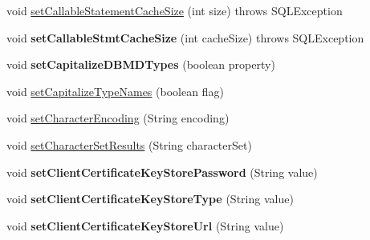 \begin{DoxyCompactItemize}
\item 
void \mbox{\hyperlink{classcom_1_1mysql_1_1jdbc_1_1_multi_host_my_s_q_l_connection_a738d6bb9fa72c912b24fa0fb9d978af9}{set\+Callable\+Statement\+Cache\+Size}} (int size)  throws S\+Q\+L\+Exception 
\item 
\mbox{\label{classcom_1_1mysql_1_1jdbc_1_1_multi_host_my_s_q_l_connection_aca19fa2d5f8975f0449f1e2cf9226229}} 
void {\bfseries set\+Callable\+Stmt\+Cache\+Size} (int cache\+Size)  throws S\+Q\+L\+Exception 
\item 
\mbox{\label{classcom_1_1mysql_1_1jdbc_1_1_multi_host_my_s_q_l_connection_a651d9f9ebbdc327a54740da71e5507a5}} 
void {\bfseries set\+Capitalize\+D\+B\+M\+D\+Types} (boolean property)
\item 
void \mbox{\hyperlink{classcom_1_1mysql_1_1jdbc_1_1_multi_host_my_s_q_l_connection_ac07f4457ad5a749c3abc81dec0fb0490}{set\+Capitalize\+Type\+Names}} (boolean flag)
\item 
void \mbox{\hyperlink{classcom_1_1mysql_1_1jdbc_1_1_multi_host_my_s_q_l_connection_a1510cc6e9c664cb49832bb26ae148e06}{set\+Character\+Encoding}} (String encoding)
\item 
void \mbox{\hyperlink{classcom_1_1mysql_1_1jdbc_1_1_multi_host_my_s_q_l_connection_a5fa2549fbd789689d65411226fc16101}{set\+Character\+Set\+Results}} (String character\+Set)
\item 
\mbox{\label{classcom_1_1mysql_1_1jdbc_1_1_multi_host_my_s_q_l_connection_a3762f842456decf2a1cd5db9ffb9e34a}} 
void {\bfseries set\+Client\+Certificate\+Key\+Store\+Password} (String value)
\item 
\mbox{\label{classcom_1_1mysql_1_1jdbc_1_1_multi_host_my_s_q_l_connection_a62c6e79c41efebbb8f06c836088baed2}} 
void {\bfseries set\+Client\+Certificate\+Key\+Store\+Type} (String value)
\item 
\mbox{\label{classcom_1_1mysql_1_1jdbc_1_1_multi_host_my_s_q_l_connection_ae3e51a563e506d48df47ab3075e441a9}} 
void {\bfseries set\+Client\+Certificate\+Key\+Store\+Url} (String value)

\end{DoxyCompactItemize}
